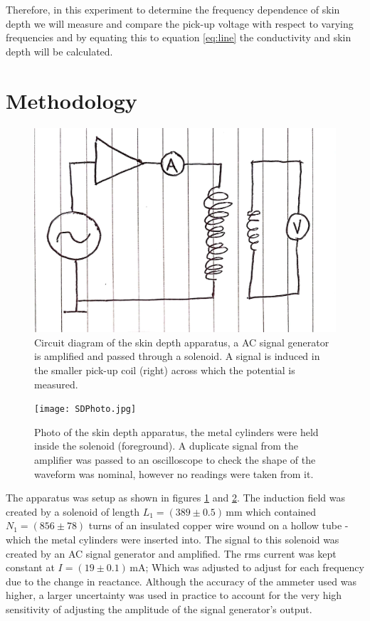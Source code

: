 \documentclass[a4paper,12pt,twocolumn]{article}
\begin{document}
	Therefore, in this experiment to determine the frequency dependence of skin depth we will measure and compare the pick-up voltage with respect to varying frequencies and by equating this to equation \ref{eq:line} the conductivity and skin depth will be calculated.
	
\section{Methodology}
	
	\begin{figure}
		\centering
		\includegraphics[scale=0.1]{SDcircuit.jpg}
		\captionsetup{font=scriptsize}
		\caption{Circuit diagram of the skin depth apparatus, a AC signal generator is amplified and passed through a solenoid. A signal is induced in the smaller pick-up coil (right) across which the potential is measured.}
		\label{fig:circuit}
	\end{figure}

	\begin{figure}
		\centering
		\texttt{[image: SDPhoto.jpg]}
		\captionsetup{font=scriptsize}
		\caption{Photo of the skin depth apparatus, the metal cylinders were held inside the solenoid (foreground). A duplicate signal from the amplifier was passed to an oscilloscope to check the shape of the waveform was nominal, however no readings were taken from it.}
		\label{fig:photo}
	\end{figure}

	The apparatus was setup as shown in figures \ref{fig:circuit} and \ref{fig:photo}. The induction field was created by a solenoid of length $L_1 = (389 \pm 0.5) \,\text{mm}$ which contained $N_1 = (856 \pm 78)$ turns of an insulated copper wire wound on a hollow tube - which the metal cylinders were inserted into. The signal to this solenoid was created by an AC signal generator and amplified. The rms current was kept constant at $I = (19 \pm 0.1)\,\text{mA}$; Which was adjusted to adjust for each frequency due to the change in reactance. Although the accuracy of the ammeter used was higher, a larger uncertainty was used in practice to account for the very high sensitivity of adjusting the amplitude of the signal generator's output.\\
	
\end{document}
